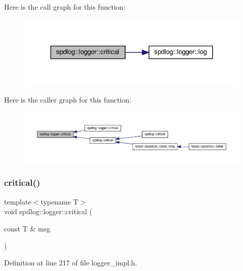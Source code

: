 Here is the call graph for this function\+:
\nopagebreak
\begin{figure}[H]
\begin{center}
\leavevmode
\includegraphics[width=324pt]{classspdlog_1_1logger_a3d11416764fe7ead94868d4c6438f583_cgraph}
\end{center}
\end{figure}
Here is the caller graph for this function\+:
\nopagebreak
\begin{figure}[H]
\begin{center}
\leavevmode
\includegraphics[width=350pt]{classspdlog_1_1logger_a3d11416764fe7ead94868d4c6438f583_icgraph}
\end{center}
\end{figure}
\mbox{\label{classspdlog_1_1logger_a3c5140393ec153b2b8478361aac80eb6}} 
\subsubsection{\texorpdfstring{critical()}{critical()}\hspace{0.1cm}{\footnotesize\ttfamily [2/2]}}
{\footnotesize\ttfamily template$<$typename T$>$ \\
void spdlog\+::logger\+::critical (\begin{DoxyParamCaption}\item[{const T \&}]{msg }\end{DoxyParamCaption})\hspace{0.3cm}{\ttfamily [inline]}}



Definition at line 217 of file logger\+\_\+impl.\+h.

